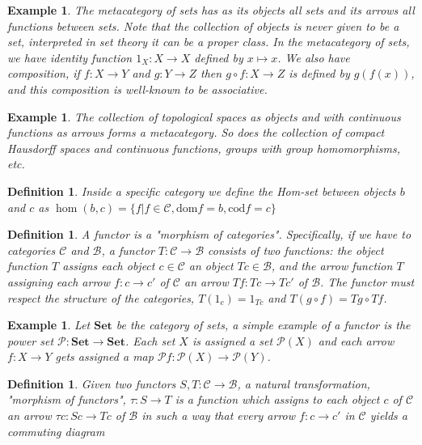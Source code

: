 \documentclass[12pt,a4paper]{article}
\newtheorem{example}[theorem]{Example}
\newtheorem{definition}[theorem]{Definition}
\newcommand\BB{\mathcal{B}}
\newcommand\CC{\mathcal{C}}
\newcommand\PP{\mathcal{P}}
\begin{document}
\begin{example}
The metacategory of sets has as its objects all sets and its arrows all functions between sets. 
Note that the collection of objects is never given to be a set, interpreted in set theory it can be a proper class. 
In the metacategory of sets, we have identity function $1_X:X\to X$ defined by $x\mapsto x$. 
We also have composition, if $f:X\to Y$ and $g: Y\to Z$ then $g\circ f:X\to Z$ is defined by $g(f(x))$, and this composition is well-known to be associative.
\end{example}

\begin{example}
    The collection of topological spaces as objects and with continuous functions as arrows forms a metacategory.
    So does the collection of compact Hausdorff spaces and continuous functions, groups with group homomorphisms, etc.
\end{example}

\begin{definition}
    Inside a specific category we define the \textit{Hom-set} between objects $b$ and $c$ as $\hom(b,c)=\{f|f\in \mathcal{C},\text{dom}f=b,\text{cod}f=c\}$
\end{definition}

\begin{definition}
    A \textit{functor} is a "morphism of categories". 
    Specifically, if we have to categories $\mathcal{C}$ and $\mathcal{B}$, a functor $T:\CC\to\BB$ consists of two functions: the \textit{object function} $T$ assigns each object $c\in\CC$ an object $Tc\in\BB$, and the \textit{arrow function} $T$ assigning each arrow $f:c\to c'$ of $\CC$ an arrow $Tf:Tc\to Tc'$ of $\BB$.
    The functor must respect the structure of the categories, $T(1_c)=1_{Tc}$ and $T(g\circ f)=Tg\circ Tf$.
\end{definition}

\begin{example}
    Let $\textbf{Set}$ be the category of sets, a simple example of a functor is the power set $\PP:\textbf{Set}\to\textbf{Set}$.
    Each set $X$ is assigned a set $\PP(X)$ and each arrow $f:X\to Y$ gets assigned a map $\PP f:\PP(X)\to\PP(Y)$.
\end{example}

\begin{definition}
    Given two functors $S,T:\CC\to\BB$, a \textit{natural transformation}, "morphism of functors", $\tau:S\to T$ is a function which assigns to each object $c$ of $\CC$ an arrow $\tau c:Sc\to Tc$ of $\BB$ in such a way that every arrow $f:c\to c'$ in $\CC$ yields a commuting diagram\\
    \begin{center}
    \end{center}
\end{definition}
\end{document}
